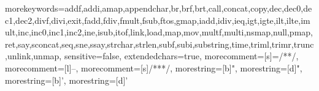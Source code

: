 {morekeywords={addf,addi,amap,appendchar,br,brf,brt,call,concat,copy,dec,dec0,dec1,dec2,divf,divi,exit,fadd,fdiv,fmult,fsub,ftos,gmap,iadd,idiv,ieq,igt,igte,ilt,ilte,imult,inc,inc0,inc1,inc2,ine,isub,itof,link,load,map,mov,multf,multi,nsmap,null,pmap,ret,say,sconcat,seq,sne,ssay,strchar,strlen,subf,subi,substring,time,triml,trimr,trunc,unlink,unmap},
sensitive=false,
extendedchars=true,
morecomment=[s]={/*}{*/},
morecomment=[l]{--},
morecomment=[s]{/**}{*/},
morestring=[b]",
morestring=[d]",
morestring=[b]',
morestring=[d]'}

